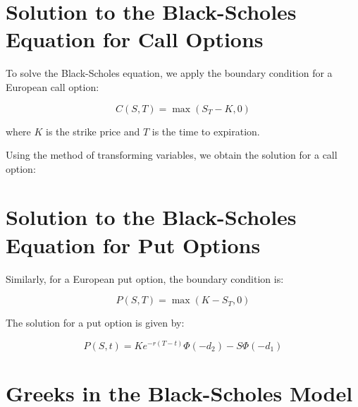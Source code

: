 \documentclass[../Main.tex]{subfiles}
\begin{document}
\section{Solution to the Black-Scholes Equation for Call Options}

To solve the Black-Scholes equation, we apply the boundary condition for a European call option:

\begin{equation}
    C(S, T) = \max(S_T - K, 0)
\end{equation}

where \( K \) is the strike price and \( T \) is the time to expiration.

Using the method of transforming variables, we obtain the solution for a call option:



\section{Solution to the Black-Scholes Equation for Put Options}

Similarly, for a European put option, the boundary condition is:

\begin{equation}
    P(S, T) = \max(K - S_T, 0)
\end{equation}

The solution for a put option is given by:

\begin{equation}
    P(S, t) = K e^{-r(T-t)} \Phi(-d_2) - S \Phi(-d_1)
\end{equation}

\section{Greeks in the Black-Scholes Model}
\end{document}
